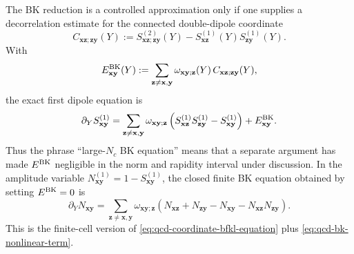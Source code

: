 The BK reduction is a controlled approximation only if one supplies a
decorrelation estimate for the connected double-dipole coordinate
\[
  C_{\mathbf x\mathbf z;\mathbf z\mathbf y}(Y)
  :=
  S_{\mathbf x\mathbf z;\mathbf z\mathbf y}^{(2)}(Y)
  -
  S_{\mathbf x\mathbf z}^{(1)}(Y)S_{\mathbf z\mathbf y}^{(1)}(Y).
\]
With
\begin{equation}
  E_{\mathbf x\mathbf y}^{\rm BK}(Y)
  :=
  \sum_{\mathbf z\ne\mathbf x,\mathbf y}
  \omega_{\mathbf x\mathbf y;\mathbf z}(Y)\,
  C_{\mathbf x\mathbf z;\mathbf z\mathbf y}(Y),
  \label{eq:qcd-bk-closure-error-coordinate}
\end{equation}
the exact first dipole equation is
\[
  \partial_Y S_{\mathbf x\mathbf y}^{(1)}
  =
  \sum_{\mathbf z\ne\mathbf x,\mathbf y}
  \omega_{\mathbf x\mathbf y;\mathbf z}
  \left(
    S_{\mathbf x\mathbf z}^{(1)}S_{\mathbf z\mathbf y}^{(1)}
    -
    S_{\mathbf x\mathbf y}^{(1)}
  \right)
  +E_{\mathbf x\mathbf y}^{\rm BK}.
\]
Thus the phrase ``large-\(N_c\) BK equation'' means that a separate argument
has made \(E^{\rm BK}\) negligible in the norm and rapidity interval under
discussion.  In the amplitude variable
\(N_{\mathbf x\mathbf y}^{(1)}=1-S_{\mathbf x\mathbf y}^{(1)}\), the closed
finite BK equation obtained by setting \(E^{\rm BK}=0\) is
\begin{equation}
  \partial_Y N_{\mathbf x\mathbf y}
  =
  \sum_{\mathbf z\ne\mathbf x,\mathbf y}
  \omega_{\mathbf x\mathbf y;\mathbf z}
  \left(
    N_{\mathbf x\mathbf z}
    +N_{\mathbf z\mathbf y}
    -N_{\mathbf x\mathbf y}
    -N_{\mathbf x\mathbf z}N_{\mathbf z\mathbf y}
  \right).
  \label{eq:qcd-finite-bk-amplitude-equation}
\end{equation}
This is the finite-cell version of
\eqref{eq:qcd-coordinate-bfkl-equation} plus
\eqref{eq:qcd-bk-nonlinear-term}.

